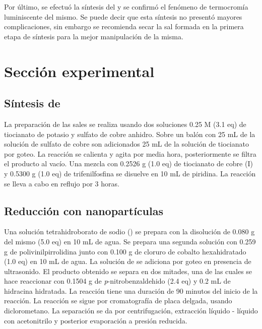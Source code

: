 \documentclass[fleqn,10pt]{SelfArx}
\begin{document}
Por último, se efectuó la síntesis del  y se confirmó el fenómeno de termocromía luminiscente del mismo. Se puede decir que esta síntesis no presentó mayores complicaciones, sin embargo se recomienda secar la sal formada en la primera etapa de síntesis para la mejor manipulación de la misma. 


\newpage
\section{Secci\'on experimental}
\subsection{S\'intesis de }
La preparaci\'on de las sales se realiza usando dos soluciones 0.25 M (3.1 eq) de tiocianato de potasio y sulfato de cobre anhidro. Sobre un bal\'on con 25 mL de la soluci\'on de sulfato de cobre son adicionados 25 mL de la soluci\'on de tiocianato por goteo. La reacci\'on se calienta y agita por media hora, posteriormente se filtra el producto al vac\'io. Una mezcla con 0.2526 g (1.0 eq) de tiocianato de cobre (I) y 0.5300 g (1.0 eq) de trifenilfosfina se disuelve en 10 mL de piridina. La reacci\'on se lleva a cabo en reflujo por 3 horas.

\subsection{Reducci\'on con nanopart\'iculas}
Una soluci\'on tetrahidroborato de sodio () se prepara con la disoluci\'on de 0.080 g del mismo (5.0 eq) en 10 mL de agua. Se prepara una segunda soluci\'on con 0.259 g de polivinilpirrolidina junto con 0.100 g de cloruro de cobalto hexahidratado (1.0 eq) en 10 mL de agua. La soluci\'on de  se adiciona por goteo en presencia de ultrasonido. El producto obtenido se separa en dos mitades, una de las cuales se hace reaccionar con 0.1504 g de \textit{p}-nitrobenzaldehido (2.4 eq) y 0.2 mL de hidracina hidratada. La reacci\'on tiene una duraci\'on de 90 minutos del inicio de la reacci\'on. La reacci\'on se sigue por cromatograf\'ia de placa delgada, usando diclorometano. La separaci\'on se da por centrifugaci\'on, extracci\'on l\'iquido - l\'iquido con acetonitrilo y posterior evaporaci\'on a presi\'on reducida.
\end{document}
